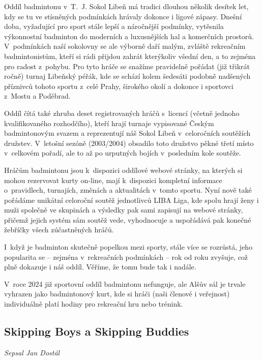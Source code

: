 \documentclass[a5paper, 11pt, twoside]{article}
\begin{document}
Oddíl badmintonu v~T.~J. Sokol Libeň má tradici dlouhou několik desítek
let, kdy se tu ve stísněných podmínkách hrávaly dokonce i ligové zápasy.
Dnešní doba, vyžadující pro sport stále lepší a náročnější podmínky,
vytěsnila výkonnostní badminton do moderních a luxusnějších hal a
komerčních prostorů. V~podmínkách naší sokolovny se ale výborně daří
malým, zvláště rekreačním badmintonistům, kteří si rádi přijdou zahrát
kterýkoliv všední den, a to zejména pro radost z~pohybu. Pro tyto hráče
se snažíme pravidelně pořádat (již třikrát ročně) turnaj Libeňský péřák,
kde se schází kolem šedesáti podobně nadšených příznivců tohoto sportu
z~celé Prahy, širokého okolí a dokonce i sportovci z~Mostu a Poděbrad.

Oddíl čítá také zhruba deset registrovaných hráčů s~licencí (včetně
jednoho kvalifikovaného rozhodčího), kteří hrají turnaje vypisované
Českým badmintonovým svazem a reprezentují náš Sokol Libeň v~celoročních
soutěžích družstev. V~letošní sezóně (2003/2004) obsadilo toto družstvo
pěkné třetí místo v~celkovém pořadí, ale to až po urputných bojích
v~posledním kole soutěže.

Hráčům badmintonu jsou k~dispozici oddílové webové stránky, na kterých
si mohou rezervovat kurty on-line, mají k~dispozici kompletní informace
o~pravidlech, turnajích, změnách a aktualitách v~tomto sportu. Nyní nově
také pořádáme unikátní celoroční soutěž jednotlivců LIBA Liga, kde spolu
hrají ženy i muži společně ve skupinách a výsledky pak sami zapisují na
webové stránky, přičemž jejich systém sám soutěž vede, vyhodnocuje a
uspořádává pak konečné žebříčky všech zúčastněných hráčů.

I~když je badminton skutečně popelkou mezi sporty, stále více se
rozrůstá, jeho popularita se -- zejména v~rekreačních podmínkách -- rok
od roku zvyšuje, což plně dokazuje i náš oddíl. Věříme, že tomu bude tak
i nadále.

V~roce 2024 již sportovní oddíl badmintonu nefunguje, ale Alšův sál je
trvale vyhrazen jako badmintonový kurt, kde si hráči (naši členové i
veřejnost) individuálně platí hodiny pro rekreační hru nebo trénink.

\subsection{Skipping Boys a Skipping Buddies}

\begin{center}
  \textit{Sepsal Jan Dostál}
\end{center}
\end{document}
